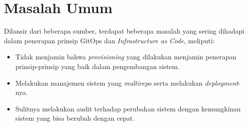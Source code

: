 \section{Masalah Umum}

Dilansir dari beberapa sumber, terdapat beberapa masalah yang sering dihadapi dalam penerapan prinsip GitOps dan \textit{Infrastructure as Code}, meliputi:

\begin{itemize}
  \item Tidak menjamin bahwa \textit{provisioning} yang dilakukan menjamin penerapan prinsip-prinsip yang baik dalam pengembangan sistem.
  \item Melakukan manajemen sistem yang \textit{multirepo} serta melakukan \textit{deployment}-nya.
  \item Sulitnya melakukan audit terhadap perubahan sistem dengan kemungkinan sistem yang bisa berubah dengan cepat.
\end{itemize}

